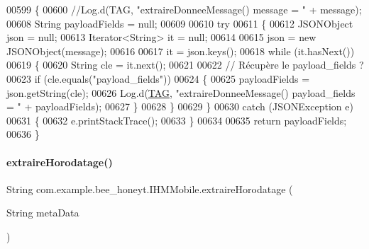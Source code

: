 \begin{DoxyCode}
00599     \{
00600         \textcolor{comment}{//Log.d(TAG, "extraireDonneeMessage() message = " + message);}
00608 \textcolor{comment}{}        String payloadFields = null;
00609 
00610         \textcolor{keywordflow}{try}
00611         \{
00612             JSONObject json = null;
00613             Iterator<String> it = null;
00614 
00615             json = \textcolor{keyword}{new} JSONObject(message);
00616 
00617             it = json.keys();
00618             \textcolor{keywordflow}{while} (it.hasNext())
00619             \{
00620                 String cle = it.next();
00621 
00622                 \textcolor{comment}{// Récupère le payload\_fields ?}
00623                 \textcolor{keywordflow}{if} (cle.equals(\textcolor{stringliteral}{"payload\_fields"}))
00624                 \{
00625                     payloadFields = json.getString(cle);
00626                     Log.d(\hyperlink{classcom_1_1example_1_1bee__honeyt_1_1_i_h_m_mobile_a366987bf9bb2ed1010b2f967d4efa263}{TAG}, \textcolor{stringliteral}{"extraireDonneeMessage() payload\_fields = "} + payloadFields);
00627                 \}
00628             \}
00629         \}
00630         \textcolor{keywordflow}{catch} (JSONException e)
00631         \{
00632             e.printStackTrace();
00633         \}
00634 
00635         \textcolor{keywordflow}{return} payloadFields;
00636     \}
\end{DoxyCode}
\mbox{\label{classcom_1_1example_1_1bee__honeyt_1_1_i_h_m_mobile_ae14deb90573474bc46817312624ebd20}} 
\paragraph{\texorpdfstring{extraire\+Horodatage()}{extraireHorodatage()}}
{\footnotesize\ttfamily String com.\+example.\+bee\+\_\+honeyt.\+I\+H\+M\+Mobile.\+extraire\+Horodatage (\begin{DoxyParamCaption}\item[{String}]{meta\+Data }\end{DoxyParamCaption})}

